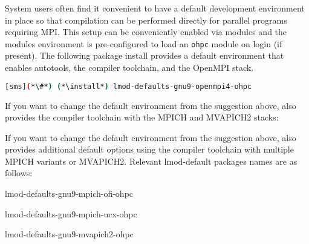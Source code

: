 System users often find it convenient to have a default development environment
in place so that compilation can be performed directly for parallel programs
requiring MPI. This setup can be conveniently enabled via modules and the \OHPC{}
modules environment is pre-configured to load an \texttt{ohpc} module on login
(if present). The following package install provides a default
environment that enables autotools, the \GNU{} compiler toolchain, and the
OpenMPI stack.

\begin{lstlisting}[language=bash]
[sms](*\#*) (*\install*) lmod-defaults-gnu9-openmpi4-ohpc
\end{lstlisting}

\begin{center}
\begin{tcolorbox}[]
\small
{}
If you want to change the default environment from the suggestion above, \OHPC{}
also provides the \GNU{} compiler toolchain with the MPICH and MVAPICH2 stacks:
\fi

If you want to change the default environment from the suggestion above, \OHPC{}
also provides additional default options using the \GNU{} compiler toolchain
with multiple MPICH variants or MVAPICH2. Relevant lmod-default packages names
are as follows:
\fi

\begin{itemize*}
\item lmod-defaults-gnu9-mpich-ofi-ohpc
\item lmod-defaults-gnu9-mpich-ucx-ohpc
\item lmod-defaults-gnu9-mvapich2-ohpc
\fi
\end{itemize*}
\end{tcolorbox}
\end{center}
